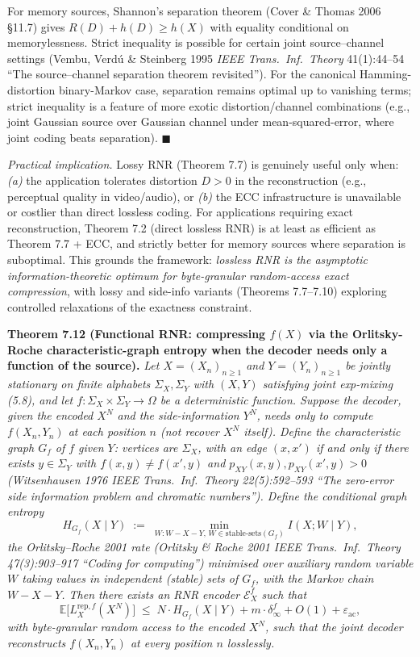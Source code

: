 \documentclass[
]{article}
\begin{document}
For memory sources, Shannon's separation theorem (Cover \& Thomas 2006
§11.7) gives $R(D) + h(D) \geq h(X)$ with equality conditional on
memorylessness. Strict inequality is possible for certain joint
source--channel settings (Vembu, Verd{\'u} \& Steinberg 1995
\emph{IEEE Trans.\ Inf.\ Theory} 41(1):44--54 ``The source--channel
separation theorem revisited''). For the canonical Hamming-distortion
binary-Markov case, separation remains optimal up to vanishing terms;
strict inequality is a feature of more exotic distortion/channel
combinations (e.g., joint Gaussian source over Gaussian channel under
mean-squared-error, where joint coding beats separation).
\hfill$\blacksquare$

\emph{Practical implication.} Lossy RNR (Theorem 7.7) is genuinely
useful only when:
\emph{(a)} the application tolerates distortion $D > 0$ in the
reconstruction (e.g., perceptual quality in video/audio), or
\emph{(b)} the ECC infrastructure is unavailable or costlier than
direct lossless coding.
For applications requiring exact reconstruction, Theorem 7.2 (direct
lossless RNR) is at least as efficient as Theorem 7.7 + ECC, and
strictly better for memory sources where separation is suboptimal.
This grounds the framework: \emph{lossless RNR is the asymptotic
information-theoretic optimum for byte-granular random-access exact
compression}, with lossy and side-info variants (Theorems 7.7--7.10)
exploring controlled relaxations of the exactness constraint.

\textbf{Theorem 7.12 (Functional RNR: compressing $f(X)$ via the
Orlitsky-Roche characteristic-graph entropy when the decoder needs
only a function of the source).}
\emph{Let $X = (X_n)_{n \geq 1}$ and $Y = (Y_n)_{n \geq 1}$ be jointly
stationary on finite alphabets $\Sigma_X, \Sigma_Y$ with $(X, Y)$
satisfying joint exp-mixing (5.8), and let
$f : \Sigma_X \times \Sigma_Y \to \Omega$ be a deterministic
function. Suppose the decoder, given the encoded $X^N$ and the
side-information $Y^N$, needs only to compute $f(X_n, Y_n)$ at each
position $n$ (not recover $X^N$ itself). Define the
\emph{characteristic graph} $G_f$ of $f$ given $Y$: vertices are
$\Sigma_X$, with an edge $(x, x')$ if and only if there exists
$y \in \Sigma_Y$ with $f(x, y) \neq f(x', y)$ and
$p_{XY}(x, y), p_{XY}(x', y) > 0$ (Witsenhausen 1976
\emph{IEEE Trans.\ Inf.\ Theory} 22(5):592--593 ``The zero-error side
information problem and chromatic numbers''). Define the
\emph{conditional graph entropy}}
\[
H_{G_f}(X \mid Y) \;:=\; \min_{W : W - X - Y,\, W \in \mathrm{stable\text{-}sets}(G_f)} I(X; W \mid Y),
\]
\emph{the Orlitsky--Roche 2001 rate (Orlitsky \& Roche 2001
\emph{IEEE Trans.\ Inf.\ Theory} 47(3):903--917 ``Coding for
computing'') minimised over auxiliary random variable $W$ taking
values in independent (stable) sets of $G_f$, with the Markov chain
$W - X - Y$. Then there exists an RNR encoder $\mathcal{E}_X^f$ such
that}
\[
\mathbb{E}\bigl[L^{\mathrm{rep},f}_X(X^N)\bigr]
\;\leq\;
N \cdot H_{G_f}(X \mid Y) + m \cdot \delta_\infty^f + O(1) + \varepsilon_{\mathrm{ac}},
\]
\emph{with byte-granular random access to the encoded $X^N$, such
that the joint decoder reconstructs $f(X_n, Y_n)$ at every position
$n$ losslessly.}
\end{document}
